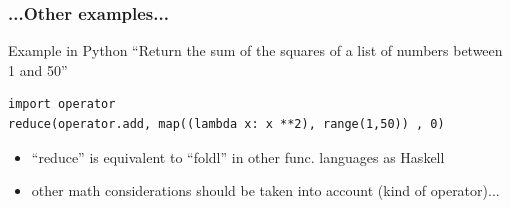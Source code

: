 \documentclass[xcolor=dvipsnames,dvip,notes=show,table]{beamer}
\begin{document}
\begin{frame}[fragile]
  \frametitle{...Other examples...}

\begin{exampleblock}{Example in Python}
``Return the sum of the squares of a list of numbers between 1 and 50''
\begin{lstlisting}
import operator
reduce(operator.add, map((lambda x: x **2), range(1,50)) , 0)
\end{lstlisting}

\end{exampleblock}


\begin{itemize}
 \item ``reduce'' is equivalent to ``foldl'' in other func. languages as Haskell
 \item other math considerations should be taken into account (kind of operator)...
\end{itemize}

\end{frame}



\end{document}
